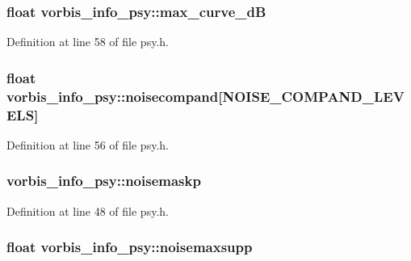 \subsubsection[{\texorpdfstring{max\+\_\+curve\+\_\+dB}{max_curve_dB}}]{\setlength{\rightskip}{0pt plus 5cm}float vorbis\+\_\+info\+\_\+psy\+::max\+\_\+curve\+\_\+dB}\hypertarget{structvorbis__info__psy_a8aeb497662b106e241bd3232016aba66}{}\label{structvorbis__info__psy_a8aeb497662b106e241bd3232016aba66}


Definition at line 58 of file psy.\+h.

\subsubsection[{\texorpdfstring{noisecompand}{noisecompand}}]{\setlength{\rightskip}{0pt plus 5cm}float vorbis\+\_\+info\+\_\+psy\+::noisecompand\mbox{[}{\bf N\+O\+I\+S\+E\+\_\+\+C\+O\+M\+P\+A\+N\+D\+\_\+\+L\+E\+V\+E\+LS}\mbox{]}}\hypertarget{structvorbis__info__psy_a30e0f5a53a3803feabbe826578c8a5e7}{}\label{structvorbis__info__psy_a30e0f5a53a3803feabbe826578c8a5e7}


Definition at line 56 of file psy.\+h.

\subsubsection[{\texorpdfstring{noisemaskp}{noisemaskp}}]{ vorbis\+\_\+info\+\_\+psy\+::noisemaskp}\hypertarget{structvorbis__info__psy_ac7d88922bbd445f3688f1b58a835afb3}{}\label{structvorbis__info__psy_ac7d88922bbd445f3688f1b58a835afb3}


Definition at line 48 of file psy.\+h.

\subsubsection[{\texorpdfstring{noisemaxsupp}{noisemaxsupp}}]{\setlength{\rightskip}{0pt plus 5cm}float vorbis\+\_\+info\+\_\+psy\+::noisemaxsupp}\hypertarget{structvorbis__info__psy_ad102882d97e34592a277c60ac6636056}{}\label{structvorbis__info__psy_ad102882d97e34592a277c60ac6636056}


